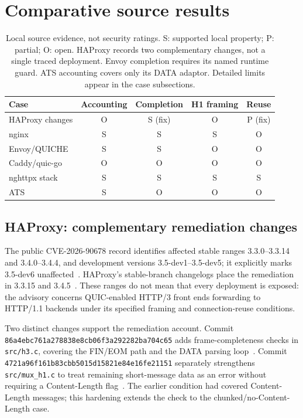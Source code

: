 \documentclass[11pt,letterpaper]{article}
\newcommand{\code}[1]{\nolinkurl{#1}}
\begin{document}
\section{Comparative source results}
\begin{table}[htbp]
\centering\small
\begin{tabular}{@{}lcccc@{}}
\toprule
Case & Accounting & Completion & H1 framing & Reuse \\
\midrule
HAProxy changes & O & S (fix) & O & P (fix) \\
nginx & S & S & S & O \\
Envoy/QUICHE & S & S & O & O \\
Caddy/quic-go & O & O & O & O \\
nghttpx stack & S & S & S & S \\
ATS & S & O & O & O \\
\bottomrule
\end{tabular}
\caption{Local source evidence, not security ratings. S: supported local property; P: partial; O: open. HAProxy records two complementary changes, not a single traced deployment. Envoy completion requires its named runtime guard. ATS accounting covers only its DATA adaptor. Detailed limits appear in the case subsections.}
\label{tab:matrix}
\end{table}

\subsection{HAProxy: complementary remediation changes}
The public CVE-2026-90678 record identifies affected stable ranges 3.3.0--3.3.14 and 3.4.0--3.4.4, and development versions 3.5-dev1--3.5-dev5; it explicitly marks 3.5-dev6 unaffected~\cite{hap90678}. HAProxy's stable-branch changelogs place the remediation in 3.3.15 and 3.4.5~\cite{hapstable}. These ranges do not mean that every deployment is exposed: the advisory concerns QUIC-enabled HTTP/3 front ends forwarding to HTTP/1.1 backends under its specified framing and connection-reuse conditions.

Two distinct changes support the remediation account. Commit \code{86a4ebc761a278838e8cb06f3a292282ba704c65} adds frame-completeness checks in \code{src/h3.c}, covering the FIN/EOM path and the DATA parsing loop~\cite{haph3fix}. Commit \code{4721a96f161b83cbb5015d15821e84e16fe21151} separately strengthens \code{src/mux_h1.c} to treat remaining short-message data as an error without requiring a Content-Length flag~\cite{haph1fix}. The earlier condition had covered Content-Length messages; this hardening extends the check to the chunked/no-Content-Length case.
\end{document}
